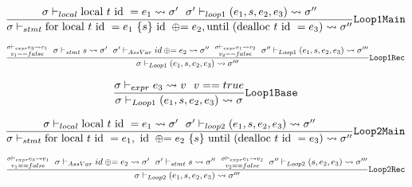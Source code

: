 \begin{equation} \label{eq:loop1Main}
    \frac{\sigma \vdash_{local} \text{local } t \text{ id } = e_1 \leadsto \sigma' ~~
        \sigma' \vdash_{loop1} (e_1, s, e_2, e_3) \leadsto \sigma''}
    {\sigma \vdash_{stmt} \text{for local }t\text{ id }= e_1 ~\{s\}\text{ id }\oplus{\kern-5.0pt}= e_2, \text{until (dealloc } t\text{ id }= e_3) \leadsto \sigma''}
    \text{\texttt{Loop1Main}}
\end{equation}

\begin{equation} \label{eq:loop1Rec}
    \frac{\substack{\sigma \vdash_{expr} e_3 \leadsto v_1 \\
            v_1 == false} ~~
        \sigma \vdash_{stmt} s \leadsto \sigma' ~~
        \sigma' \vdash_{AssVar} id \oplus{\kern-5.0pt}= e_2 \leadsto \sigma'' ~~
        \substack{\sigma \vdash_{expr} e_1 \leadsto v_2 \\
            v_2 == false} ~~
        \sigma'' \vdash_{Loop1} (e_1, s, e_2, e_3) \leadsto \sigma'''}
    {\sigma \vdash_{Loop1} (e_1, s, e_2, e_3) \leadsto \sigma'''}
    \text{\texttt{Loop1Rec}}
\end{equation}

\begin{equation} \label{eq:loop1Base}
    \frac{\sigma \vdash_{expr} e_3 \leadsto v ~~
        v == true}
    {\sigma \vdash_{Loop1} (e_1, s, e_2, e_3) \leadsto \sigma}
    \text{\texttt{Loop1Base}}
\end{equation}

\begin{equation} \label{eq:loop2Main}
    \frac{\sigma \vdash_{local} \text{local } t \text{ id } = e_1 \leadsto \sigma' ~~
        \sigma' \vdash_{loop2} (e_1, s, e_2, e_3) \leadsto \sigma''}
    {\sigma \vdash_{stmt} \text{for local }t\text{ id }= e_1,\text{ id }\oplus{\kern-5.0pt}= e_2 ~\{s\} \text{ until (dealloc } t\text{ id }= e_3) \leadsto \sigma''}
    \text{\texttt{Loop2Main}}
\end{equation}

\begin{equation} \label{eq:loop2Rec}
    \frac{\substack{\sigma \vdash_{expr} e_3 \leadsto v_1 \\
            v_1 == false} ~~
        \sigma \vdash_{AssVar} id \oplus{\kern-5.0pt}= e_2 \leadsto \sigma' ~~
        \sigma' \vdash_{stmt} s \leadsto \sigma'' ~~
        \substack{\sigma \vdash_{expr} e_1 \leadsto v_2 \\
            v_2 == false} ~~
        \sigma'' \vdash_{Loop2} (s, e_2, e_3) \leadsto \sigma'''}
    {\sigma \vdash_{Loop2} (e_1, s, e_2, e_3) \leadsto \sigma'''}
    \text{\texttt{Loop2Rec}}
\end{equation}

